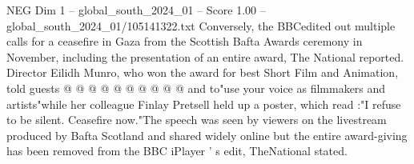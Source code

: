 \begin{textsample}{NEG Dim 1 – global\_south\_2024\_01 – Score 1.00 – global\_south\_2024\_01/105141322.txt}
Conversely, the BBCedited out multiple calls for a ceasefire in Gaza from the Scottish Bafta Awards ceremony in November, including the presentation of an entire award, The National reported.
Director Eilidh Munro, who won the award for best Short Film and Animation, told guests @ @ @ @ @ @ @ @ @ @ and to"use your voice as filmmakers and artists"while her colleague Finlay Pretsell held up a poster, which read :"I refuse to be silent.
Ceasefire now."The speech was seen by viewers on the livestream produced by Bafta Scotland and shared widely online but the entire award-giving has been removed from the BBC iPlayer ' s edit, TheNational stated.

\end{textsample}
